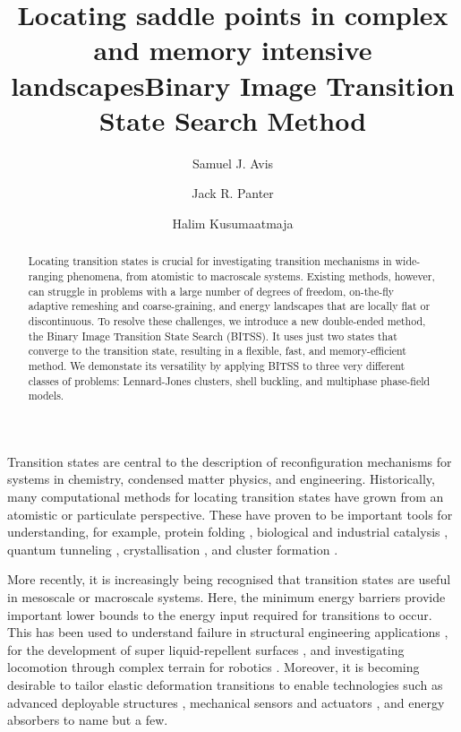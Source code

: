 \documentclass[aps,prl,twocolumn,10pt,groupedaddress]{revtex4-2}
\begin{document}
\title{Locating saddle points in complex and memory intensive landscapes}
\title{Binary Image Transition State Search Method}
\author{Samuel J. Avis}
\author{Jack R. Panter}
\author{Halim Kusumaatmaja}

\begin{abstract}
  Locating transition states is crucial for investigating transition mechanisms in wide-ranging phenomena, from atomistic to macroscale systems.
  Existing methods, however, can struggle in problems with a large number of degrees of freedom, on-the-fly adaptive remeshing and coarse-graining, and energy landscapes that are locally flat or discontinuous.
  To resolve these challenges, we introduce a new double-ended method, the Binary Image Transition State Search (BITSS).
  It uses just two states that converge to the transition state, resulting in a flexible, fast, and memory-efficient method.
  We demonstate its versatility by applying BITSS to three very different classes of problems: Lennard-Jones clusters, shell buckling, and multiphase phase-field models.
\end{abstract}

\maketitle


Transition states are central to the description of reconfiguration mechanisms for systems in chemistry, condensed matter physics, and engineering.
Historically, many computational methods for locating transition states have grown from an atomistic or particulate perspective.
These have proven to be important tools for understanding, for example, protein folding \cite{Bryngelson1995,Onuchic1997}, biological and industrial catalysis \cite{Boehr2006,Kerns2015,Guo2018a}, quantum tunneling \cite{Richardson2016,Vaillant2019}, crystallisation \cite{Richard2018}, and cluster formation \cite{Wales1998,Wales2012}.

More recently, it is increasingly being recognised that transition states are useful in mesoscale or macroscale systems.
Here, the minimum energy barriers provide important lower bounds to the energy input required for transitions to occur.
This has been used to understand failure in structural engineering applications \cite{Panter2019,Hutchinson2018}, for the development of super liquid-repellent surfaces \cite{Zhang2014,Panter2019b}, and investigating locomotion through complex terrain for robotics \cite{Othayoth2020}.
Moreover, it is becoming desirable to tailor elastic deformation transitions to enable technologies such as advanced deployable structures \cite{Filipov2015,Zhai2018}, mechanical sensors and actuators \cite{Bertoldi2017,Truby2016,Chi2022,Bonfanti2020}, and energy absorbers \cite{Shan2015,Giri2021} to name but a few.
\end{document}

